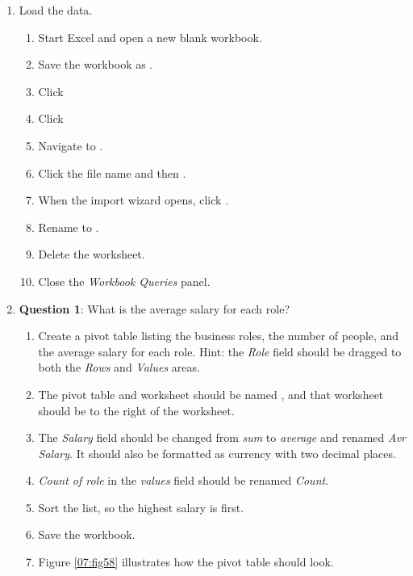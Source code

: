 \begin{enumbox}
	\begin{enumerate}
		\item Load the data.
		
		\begin{enumerate}
			\item Start Excel and open a new blank workbook.
			\item Save the workbook as .
			\item {} Click 
			\item {} Click 
			\item Navigate to .
			\item Click the file name and then .
			\item When the import wizard opens, click .
			\item Rename  to .
			\item Delete the  worksheet.
			\item Close the \textit{Workbook Queries} panel.
		\end{enumerate}
		
		\item{\textbf{Question 1}: What is the average salary for each role?}
		
		\begin{enumerate}
			\item Create a pivot table listing the business roles, the number of people, and the average salary for each role. Hint: the \textit{Role} field should be dragged to both the \textit{Rows} and \textit{Values} areas.
			\item The pivot table and worksheet should be named , and that worksheet should be to the right of the  worksheet.
			\item The \textit{Salary} field should be changed from \textit{sum} to \textit{average} and renamed \textit{Avr Salary}. It should also be formatted as currency with two decimal places.
			\item \textit{Count of role} in the \textit{values} field should be renamed \textit{Count}.
			\item Sort the list, so the highest salary is first. 
			\item Save the  workbook.
			\item Figure \ref{07:fig58} illustrates how the pivot table should look.
		\end{enumerate}
	

\end{enumerate}
\end{enumbox}
